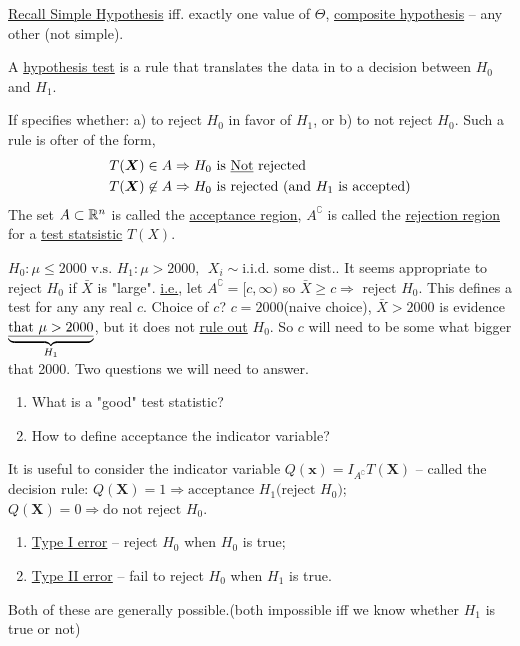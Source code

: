 \documentclass[english, 11pt]{article}
\begin{document}
\underline{Recall Simple Hypothesis} iff. exactly one value of $\Theta$, \underline{composite hypothesis} -- any other (not simple).

\begin{defn}
A \underline{hypothesis test} is a rule that translates the data in to a decision between $H_0$ and $H_1$. 
\end{defn}
If specifies whether: a) to reject $H_0$ in favor of $H_1$, or b) to not reject $H_0$. Such a rule is ofter of the form,
$$
\begin{aligned}
T(\bm{X})\in A&\Rightarrow H_0 \text{ is \underline{Not} rejected}\\
T(\bm{X})\not\in A&\Rightarrow H_0 \text{ is rejected (and $H_1$ is accepted)}
\end{aligned}
$$
The set $A\subset {\mathbb{R}}^n$ is called the \underline{acceptance region}, $A^\complement$ is called the \underline{rejection region} for a \underline{test statsistic} $T(X)$.

\begin{exmp}
$H_0:\mu\leq 2000 \text{ v.s. } H_1:\mu>2000, \ \ X_i\sim \text{i.i.d. some dist.}$. It seems appropriate to reject $H_0$ if $\bar{X}$ is "large". \underline{i.e.}, let $A^\complement=[c, \infty)$ so $\bar{X}\geqslant c\Rightarrow$ reject $H_0$. This defines a test for any any real $c$. Choice of $c$? $c=2000$(naive choice), $\bar{X}>2000$ is evidence $\underbrace{\text{\underline{that $\mu>2000$}}}_{H_1}$, but it does not \underline{rule out} $H_0$. So $c$ will need to be some what bigger that 2000. Two questions we will need to answer.
\begin{enumerate}
\item What is a "good" test statistic?
\item How to define acceptance the indicator variable?
\end{enumerate}
It is useful to consider the indicator variable $Q(\bm{x})=I_{A^\complement}T(\bm{X})$ -- called the decision rule: $Q(\bm{X})=1\Rightarrow \text{acceptance $H_1$(reject $H_0$)}$; $Q(\bm{X})=0\Rightarrow \text{do not reject $H_0$}$.
\end{exmp}
\begin{defn}
\begin{enumerate}
\item \underline{Type I error} -- reject $H_0$ when $H_0$ is true;
\item \underline{Type II error} -- fail to reject $H_0$ when $H_1$ is true.
\end{enumerate}
Both of these are generally possible.(both impossible iff we know whether $H_1$ is true or not)
\end{defn}
\end{document}
